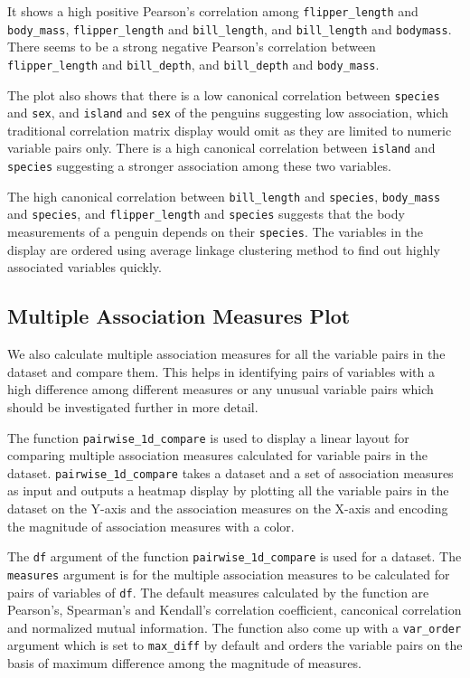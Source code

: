 It shows a high positive Pearson's correlation among
\texttt{flipper\_length} and \texttt{body\_mass},
\texttt{flipper\_length} and \texttt{bill\_length}, and
\texttt{bill\_length} and \texttt{bodymass}. There seems to be a strong
negative Pearson's correlation between \texttt{flipper\_length} and
\texttt{bill\_depth}, and \texttt{bill\_depth} and \texttt{body\_mass}.

The plot also shows that there is a low canonical correlation between
\texttt{species} and \texttt{sex}, and \texttt{island} and \texttt{sex}
of the penguins suggesting low association, which traditional
correlation matrix display would omit as they are limited to numeric
variable pairs only. There is a high canonical correlation between
\texttt{island} and \texttt{species} suggesting a stronger association
among these two variables.

The high canonical correlation between \texttt{bill\_length} and
\texttt{species}, \texttt{body\_mass} and \texttt{species}, and
\texttt{flipper\_length} and \texttt{species} suggests that the body
measurements of a penguin depends on their \texttt{species}. The
variables in the display are ordered using average linkage clustering
method to find out highly associated variables quickly.

\hypertarget{multiple-association-measures-plot}{%
\subsection{Multiple Association Measures
Plot}\label{multiple-association-measures-plot}}

We also calculate multiple association measures for all the variable
pairs in the dataset and compare them. This helps in identifying pairs
of variables with a high difference among different measures or any
unusual variable pairs which should be investigated further in more
detail.

The function \texttt{pairwise\_1d\_compare} is used to display a linear
layout for comparing multiple association measures calculated for
variable pairs in the dataset. \texttt{pairwise\_1d\_compare} takes a
dataset and a set of association measures as input and outputs a heatmap
display by plotting all the variable pairs in the dataset on the Y-axis
and the association measures on the X-axis and encoding the magnitude of
association measures with a color.

The \texttt{df} argument of the function \texttt{pairwise\_1d\_compare}
is used for a dataset. The \texttt{measures} argument is for the
multiple association measures to be calculated for pairs of variables of
\texttt{df}. The default measures calculated by the function are
Pearson's, Spearman's and Kendall's correlation coefficient, canconical
correlation and normalized mutual information. The function also come up
with a \texttt{var\_order} argument which is set to \texttt{max\_diff}
by default and orders the variable pairs on the basis of maximum
difference among the magnitude of measures.

